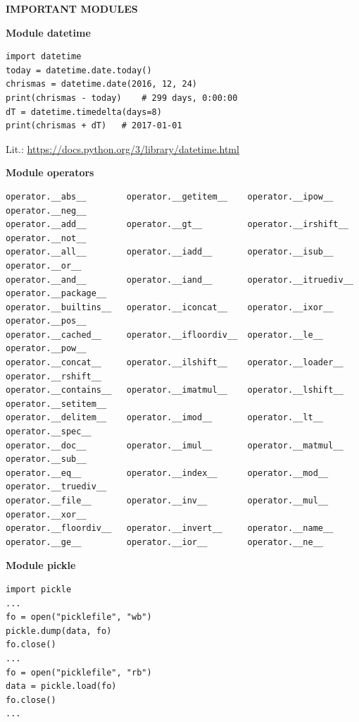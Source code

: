 \documentclass[9pt,a4wide]{extarticle}
\begin{document}
\bigskip
{\LARGE\bf IMPORTANT MODULES}
{}

\bigskip
{\LARGE\bf Module datetime}

\begin{verbatim}
import datetime                                                                               
today = datetime.date.today()
chrismas = datetime.date(2016, 12, 24)
print(chrismas - today)    # 299 days, 0:00:00
dT = datetime.timedelta(days=8)     
print(chrismas + dT)   # 2017-01-01
\end{verbatim}

Lit.: \url{https://docs.python.org/3/library/datetime.html}


\bigskip
{\LARGE\bf Module operators}


\begin{verbatim}
operator.__abs__        operator.__getitem__    operator.__ipow__       operator.__neg__
operator.__add__        operator.__gt__         operator.__irshift__    operator.__not__
operator.__all__        operator.__iadd__       operator.__isub__       operator.__or__
operator.__and__        operator.__iand__       operator.__itruediv__   operator.__package__
operator.__builtins__   operator.__iconcat__    operator.__ixor__       operator.__pos__
operator.__cached__     operator.__ifloordiv__  operator.__le__         operator.__pow__
operator.__concat__     operator.__ilshift__    operator.__loader__     operator.__rshift__
operator.__contains__   operator.__imatmul__    operator.__lshift__     operator.__setitem__
operator.__delitem__    operator.__imod__       operator.__lt__         operator.__spec__
operator.__doc__        operator.__imul__       operator.__matmul__     operator.__sub__
operator.__eq__         operator.__index__      operator.__mod__        operator.__truediv__
operator.__file__       operator.__inv__        operator.__mul__        operator.__xor__
operator.__floordiv__   operator.__invert__     operator.__name__       
operator.__ge__         operator.__ior__        operator.__ne__         
\end{verbatim}



\bigskip
{\LARGE\bf Module pickle}

\begin{verbatim}
import pickle
...
fo = open("picklefile", "wb")
pickle.dump(data, fo)
fo.close()
...
fo = open("picklefile", "rb")
data = pickle.load(fo)
fo.close()
...
\end{verbatim}
\end{document}
